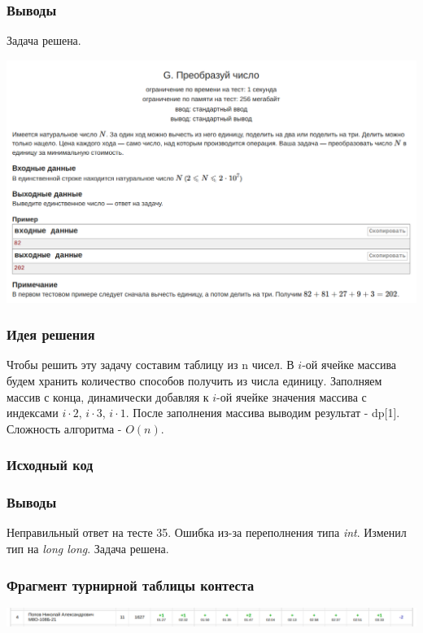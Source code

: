 \subsubsection*{Выводы}
Задача решена.
\newline

\begin{center}
\includegraphics[width=\textwidth]{statements/Contest3G.png}
\end{center}

\subsubsection*{Идея решения}

Чтобы решить эту задачу составим таблицу из n чисел. В $i$-ой ячейке массива будем хранить количество способов получить из числа единицу.
Заполняем массив с конца, динамически добавляя к $i$-ой ячейке значения массива с индексами $i\cdot2$, $i\cdot3$, $i\cdot1$. 
После заполнения массива выводим результат - dp[1].
Сложность алгоритма - $O(n)$.

\subsubsection*{Исходный код}


\subsubsection*{Выводы}

Неправильный ответ на тесте 35. Ошибка из-за переполнения типа \textit{int}. Изменил тип на \textit{long long}. Задача решена.
\newline

\subsubsection*{Фрагмент турнирной таблицы контеста}
\begin{center}
\includegraphics[width=\textwidth]{standings/Contest1Result.png}\newline\noindent
\end{center}


